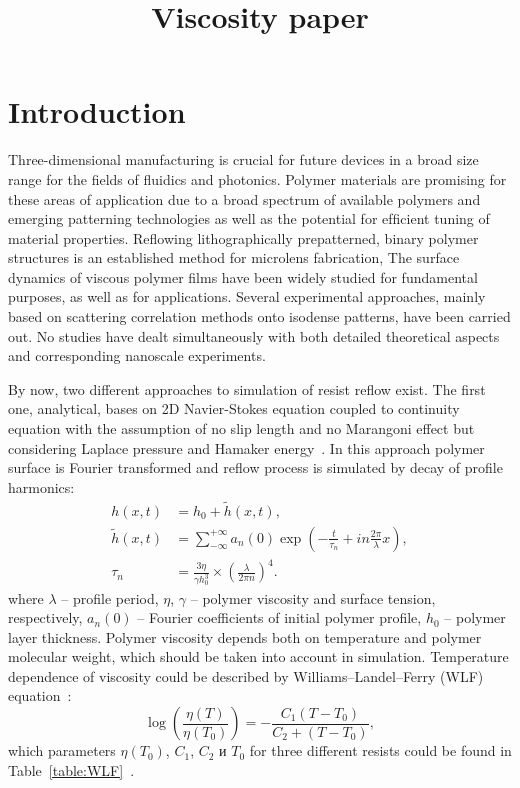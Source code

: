 \documentclass[12pt, letterpaper]{article}
\title{Viscosity paper}
\begin{document}
\section{Introduction}

Three-dimensional manufacturing is crucial for future devices in a broad size range for the fields of fluidics and photonics. Polymer materials are promising for these areas of application due to a broad spectrum of available polymers and emerging patterning technologies as well as the potential for efﬁcient tuning of material properties. Reﬂowing lithographically prepatterned, binary polymer structures is an established method for microlens fabrication,
The surface dynamics of viscous polymer films have been widely studied for fundamental purposes, as well as for applications. Several experimental approaches, mainly based on scattering correlation methods onto isodense patterns, have been carried out. No studies have dealt simultaneously with both detailed theoretical aspects and corresponding nanoscale experiments.

By now, two different approaches to simulation of resist reflow exist. The first one, analytical, bases on 2D Navier-Stokes equation coupled to continuity equation with the assumption of no slip length and no Marangoni effect but considering Laplace pressure and Hamaker energy~\cite{Leveder_2010}. In this approach polymer surface is Fourier transformed and reflow process is simulated by decay of profile harmonics:
\begin{align} \label{eq:Fourier}
	h(x, t) &= h_0 + \tilde{h}(x, t),\\
	\tilde{h}(x, t) &= \sum_{-\infty}^{+\infty} a_n(0) \exp \left(-\frac{t}{\tau_n}+i n \frac{2 \pi}{\lambda} x \right),\\
	\tau_n &= \frac{3 \eta}{\gamma h_0^3} \times \left( \frac{\lambda}{2 \pi n} \right)^4.
\end{align}
where $\lambda$ -- profile period, $\eta$, $\gamma$ -- polymer viscosity and surface tension, respectively, $a_n(0)$ -- Fourier coefficients of initial polymer profile, $h_0$ -- polymer layer thickness. Polymer viscosity depends both on temperature and polymer molecular weight, which should be taken into account in simulation. Temperature dependence of viscosity could be described by Williams–Landel–Ferry (WLF) equation~\cite{bird1987dynamics_WLF}:
\begin{equation} \label{eq:WLF}
	\log \left( \frac{\eta(T)}{\eta(T_0)} \right) = -\frac{C_1(T-T_0)}{C_2+(T-T_0)},
\end{equation}
which parameters $\eta(T_0)$, $C_1$, $C_2$ и $T_0$ for three different resists could be found in Table~\ref{table:WLF}~\cite{aho2008measurement_WLF}.
\end{document}
